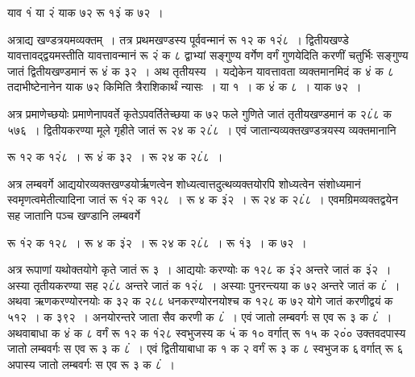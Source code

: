 \documentclass[11pt, openany]{book}
\begin{document}
\begin{sloppypar}
\begin{center}
\hspace{-25mm} याव १ं या २ं याक ७२ रू १३ं क ७२~।
\end{center}
\vspace{-1mm}

अत्राद्य खण्डत्रयमव्यक्तम्~। तत्र प्रथमखण्डस्य पूर्ववन्मानं रू १२ क १२ं८~। द्वितीयखण्डे यावत्तावद्द्वयमस्तीति यावत्तावन्मानं रू २ं क ८ द्वाभ्यां सङ्गुण्य वर्गेण वर्गं गुणयेदिति करणीं चतुर्भिः सङ्गुण्य जातं द्वितीयखण्डमानं रू ४ं क ३२~। अथ तृतीयस्य~। यद्येकेन यावत्तावता व्यक्तमानमिदं क ४ं क ८ तदाभीष्टेनानेन याक ७२ किमिति त्रैराशिकार्थं न्यासः~। या १~। क ४ं क ८~। याक ७२~।

\end{sloppypar}

\newpage

\begin{sloppypar}
अत्र प्रमाणेच्छयोः प्रमाणेनापवर्ते कृतेऽपवर्तितेच्छया क ७२ फले गुणिते जातं तृतीयखण्डमानं क २८ं८ क ५७६~। द्वितीयकरण्या मूले गृहीते जातं रू २४ क २८ं८~। एवं जातान्यव्यक्तखण्डत्रयस्य व्यक्तमानानि\\
\vspace{-2mm}

रू १२ क १२ं८~। रू ४ं क ३२~। रू २४ क २८ं८~।\\
\vspace{-2mm}

अत्र लम्बवर्गे आद्ययोरव्यक्तखण्डयोर्ऋणत्वेन शोध्यत्वात्तदुत्थव्यक्तयोरपि शोध्यत्वेन संशोध्यमानं स्वमृणत्वमेतीत्यादिना जातं रू १ं२ क १२८~। रू ४ क ३ं२~। रू २४ क २८ं८~। एवमग्रिमव्यक्तद्वयेन सह जातानि पञ्च खण्डानि लम्बवर्गे\\
\vspace{-2mm}

रू १ं२ क १२८~। रू ४ क ३ं२~। रू २४ क २८ं८~। रू १ं३~। क ७२~।\\ 
\vspace{-2mm}

अत्र रूपाणां यथोक्तयोगे कृते जातं रू ३~। आद्ययोः करण्योः क १२८ क ३ं२ अन्तरे जातं क ३ं२~। अस्या तृतीयकरण्या सह २८ं८ अन्तरे जातं क १२ं८~। अस्याः पुनरन्त्यया क ७२ अन्तरे जातं क ८ं~। अथवा ऋणकरण्योरनयोः क ३२ क २८८ धनकरण्योरनयोश्च क १२८ क ७२ योगे जातं करणीद्वयं क ५१२~। क ३९२~। अनयोरन्तरे जाता सैव करणी क ८ं~। एवं जातो लम्बवर्गः स एव रू ३ क ८ं~। अथवाबाधा क ४ं क ८ वर्गं रू १२ क १ं२८ स्वभुजस्य क ५ं क १० वर्गात् रू १५ क २०ं० उक्तवदपास्य जातो लम्बवर्गः स एव रू ३ क ८ं~। एवं द्वितीयाबाधा क १ क २ वर्गं रू ३ क ८ स्वभुज\textendash \,क ६\textendash \,वर्गात् रू ६ अपास्य जातो लम्बवर्गः स एव रू ३ क ८ं~।\\


\end{sloppypar}
\end{document}
